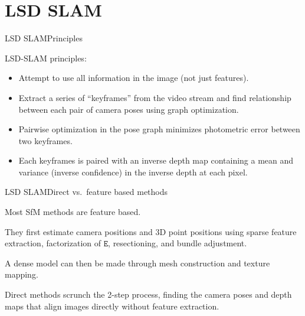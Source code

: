 \documentclass[aspectratio=169]{beamer}
\newcommand{\mat}[1]{\mathtt{#1}}
\newcommand{\myfig}[3]{\centerline{\texttt{[image: \#2]}}
    \centerline{\scriptsize \begin{minipage}{#1} \centering #3 \end{minipage}}}
\begin{document}
\section{LSD SLAM}



\begin{frame}{LSD SLAM}{Principles}

  LSD-SLAM principles:
  \begin{itemize}
  \item Attempt to use all information in the image (not just
    features).
  \item Extract a series of ``keyframes'' from the video stream and
    find relationship between each pair of camera poses using graph
    optimization.
  \item Pairwise optimization in the pose graph minimizes
    \alert{photometric error} between two keyframes.
  \item Each keyframes is paired with an \alert{inverse depth map}
    containing a mean and variance (inverse confidence) in the inverse
    depth at each pixel.
  \end{itemize}

\end{frame}


\begin{frame}{LSD SLAM}{Direct vs.\ feature based methods} 

  Most SfM methods are \alert{feature based}.

  \medskip

  They first estimate camera positions and 3D point positions using
  sparse feature extraction, factorization of $\mat{E}$, resectioning,
  and bundle adjustment.

  \medskip

  A dense model can then be made through mesh construction and texture
  mapping.

  \medskip

  \alert{Direct methods} scrunch the 2-step process, finding the
  camera poses and depth maps that align images directly without
  feature extraction.
  
\end{frame}
\end{document}

